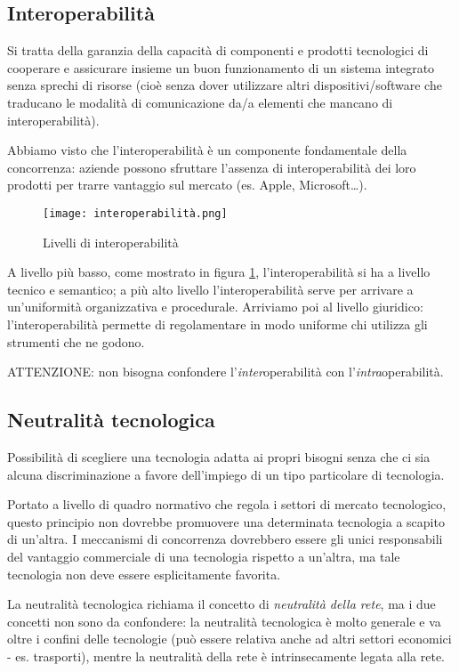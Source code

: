 \subsection{Interoperabilità}

Si tratta della garanzia della capacità di componenti e prodotti tecnologici di cooperare e assicurare insieme un buon funzionamento di un sistema integrato senza sprechi di risorse (cioè senza dover utilizzare altri dispositivi/software che traducano le modalità di comunicazione da/a elementi che mancano di interoperabilità).

Abbiamo visto che l'interoperabilità è un componente fondamentale della concorrenza: aziende possono sfruttare l'assenza di interoperabilità dei loro prodotti per trarre vantaggio sul mercato (es. Apple, Microsoft\dots).

\begin{figure}
    \centering
    \texttt{[image: interoperabilità.png]}
    \caption{Livelli di interoperabilità}
    \label{Interoperabilita}
\end{figure}

A livello più basso, come mostrato in figura \ref{Interoperabilita}, l'interoperabilità si ha a livello tecnico e semantico; a più alto livello l'interoperabilità serve per arrivare a un'uniformità organizzativa e procedurale. 
Arriviamo poi al livello giuridico: l'interoperabilità permette di regolamentare in modo uniforme chi utilizza gli strumenti che ne godono. \bigskip

ATTENZIONE: non bisogna confondere l'\textit{inter}operabilità con l'\textit{intra}operabilità. 

\subsection{Neutralità tecnologica}
Possibilità di scegliere una tecnologia adatta ai propri bisogni senza che ci sia alcuna discriminazione a favore dell'impiego di un tipo particolare di tecnologia.

Portato a livello di quadro normativo che regola i settori di mercato tecnologico, questo principio non dovrebbe promuovere una determinata tecnologia a scapito di un'altra.
I meccanismi di concorrenza dovrebbero essere gli unici responsabili del vantaggio commerciale di una tecnologia rispetto a un'altra, ma tale tecnologia non deve essere esplicitamente favorita.

La neutralità tecnologica richiama il concetto di \textit{neutralità della rete}, ma i due concetti non sono da confondere:
la neutralità tecnologica è molto generale e va oltre i confini delle tecnologie (può essere relativa anche ad altri settori economici - es. trasporti), mentre la neutralità della rete è intrinsecamente legata alla rete.

